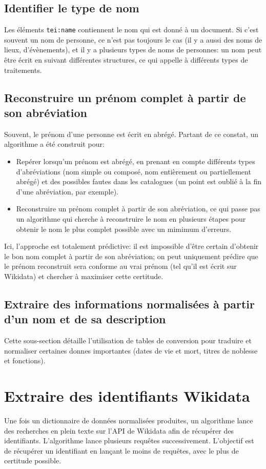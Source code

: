 \documentclass[a4paper, 12pt, twoside]{book}
\begin{document}
\subsection{Identifier le type de nom}
Les éléments \texttt{tei:name} contiennent le nom qui est donné à un document. Si c'est souvent un nom de personne, ce n'est pas toujours le cas (il y a aussi des noms de lieux, d'évènements), et il y a plusieurs types de noms de personnes: un nom peut être écrit en suivant différentes structures, ce qui appelle à différents types de traitements.

\subsection{Reconstruire un prénom complet à partir de son abréviation}
Souvent, le prénom d'une personne est écrit en abrégé. Partant de ce constat, un algorithme a été construit pour:
\begin{itemize}
	\item Repérer lorsqu'un prénom est abrégé, en prenant en compte différents types d'abréviations (nom simple ou composé, nom entièrement ou partiellement abrégé) et des possibles fautes dans les catalogues (un point est oublié à la fin d'une abréviation, par exemple).
	\item Reconstruire un prénom complet à partir de son abréviation, ce qui passe pas un algorithme qui cherche à reconstruire le nom en plusieurs étapes pour obtenir le nom le plus complet possible avec un mimimum d'erreurs.
\end{itemize}

Ici, l'approche est totalement prédictive: il est impossible d'être certain d'obtenir le bon nom complet à partir de son abréviation; on peut uniquement prédire que le prénom reconstruit sera conforme au vrai prénom (tel qu'il est écrit sur Wikidata) et chercher à maximiser cette certitude.

\subsection{Extraire des informations normalisées à partir d'un nom et de sa description}
Cette sous-section détaille l'utilisation de tables de conversion pour traduire et normaliser certaines donnes importantes (dates de vie et mort, titres de noblesse et fonctions).

\section{Extraire des identifiants Wikidata}
Une fois un dictionnaire de données normalisées produites, un algorithme lance des recherches en plein texte sur l'API de Wikidata afin de récupérer des identifiants. L'algorithme lance plusieurs requêtes successivement. L'objectif est de récupérer un identifiant en lançant le moins de requêtes, avec le plus de certitude possible.
\end{document}
